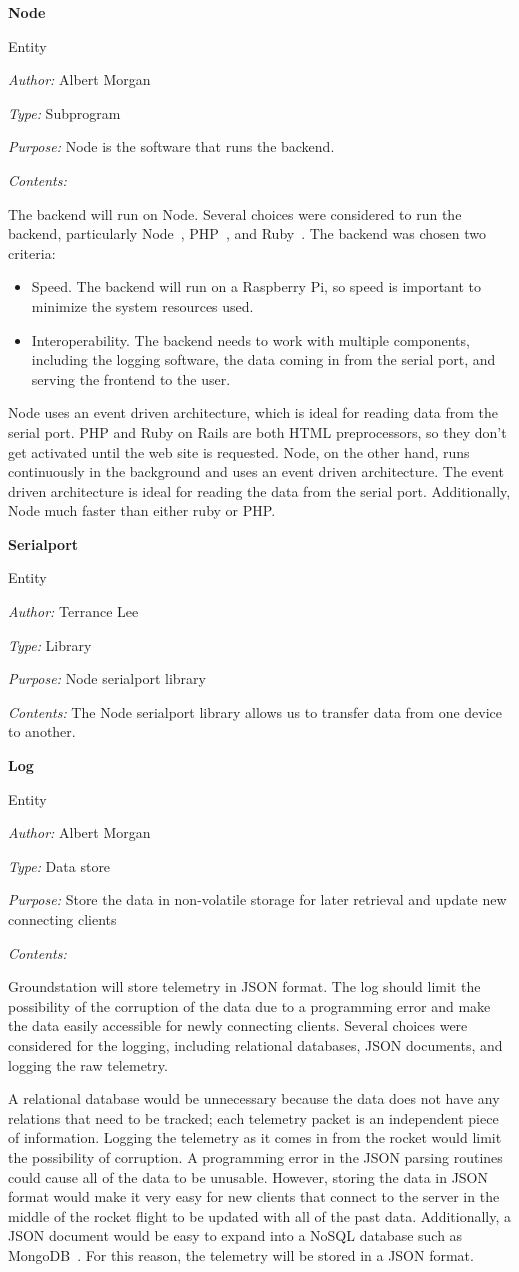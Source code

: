 \documentclass[10pt,draftclsnofoot,onecolumn]{IEEEtran}
\newcommand{\newentity}[5]{

	\noindent\textbf{#2}
	
	\noindent Entity
	
	\noindent\textit{Author:} {#1}
		
	\noindent\textit{Type:} {#3}
	
	\noindent\textit{Purpose:} {#4}

	\noindent\textit{Contents:} {#5}
	\vspace{.5cm}

}
\begin{document}
	\newentity
	{Albert Morgan}
	{Node}
	{Subprogram}
	{Node is the software that runs the backend.}
	{
		The backend will run on Node. Several choices were considered to run the backend, particularly Node~\cite{node}, PHP~\cite{php}, and Ruby~\cite{ruby}.
		The backend was chosen two criteria:
		\begin{itemize}
			\item Speed. The backend will run on a Raspberry Pi, so speed is important to minimize the system resources used.
			\item Interoperability. The backend needs to work with multiple components, including the logging software, the data coming in from the serial port, and serving the frontend to the user.
		\end{itemize}
		Node uses an event driven architecture, which is ideal for reading data from the serial port.
		PHP and Ruby on Rails are both HTML preprocessors, so they don't get activated until the web site is requested.
		Node, on the other hand, runs continuously in the background and uses an event driven architecture.
		The event driven architecture is ideal for reading the data from the serial port.
		Additionally, Node much faster than either ruby or PHP.	
	}

	\newentity
	{Terrance Lee}
	{Serialport}
	{Library}
	{Node serialport library}
	{The Node serialport library allows us to transfer data from one device to another. }

	\newentity
	{Albert Morgan}
	{Log}
	{Data store}
	{Store the data in non-volatile storage for later retrieval and update new connecting clients}
	{
		Groundstation will store telemetry in JSON format.
		The log should limit the possibility of the corruption of the data due to a programming error
		and make the data easily accessible for newly connecting clients.
		Several choices were considered for the logging, including relational databases, JSON documents, and logging the raw telemetry.
		
		A relational database would be unnecessary because the data does not have any relations that need to be tracked;
		each telemetry packet is an independent piece of information.
		Logging the telemetry as it comes in from the rocket would limit the possibility of corruption.
		A programming error in the JSON parsing routines could cause all of the data to be unusable.
		However, storing the data in JSON format would make it very easy for new clients that connect to the server in the middle of the rocket flight to be updated with all of the past data.
		Additionally, a JSON document would be easy to expand into a NoSQL database such as MongoDB~\cite{mongodb}.
		For this reason, the telemetry will be stored in a JSON format.
	}
	
\end{document}
